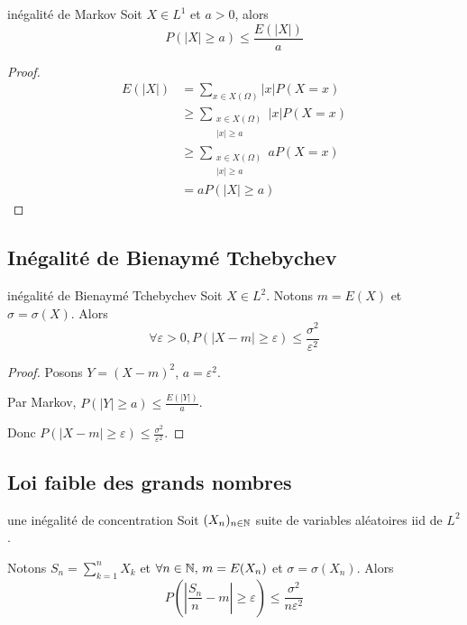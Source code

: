 \begin{proposition}{inégalité de Markov}{}
    Soit $X \in L^1$ et $a > 0$, alors 
    $$ P(|X| \geqslant a) \leqslant \frac{E(|X|)}{a} $$
\end{proposition}

\begin{proof}
    \begin{align}
        E(|X|) & = \sum_{x \in X(\Omega)} |x| P(X = x) \\
        & \geqslant \sum_{\substack{x \in X(\Omega) \\ |x| \geqslant a}} |x| P(X = x) \\
        & \geqslant \sum_{\substack{x \in X(\Omega) \\ |x| \geqslant a}} a P(X = x) \\
        & = a P(|X| \geqslant a)
    \end{align}
\end{proof}

\subsection{Inégalité de Bienaymé Tchebychev}

\begin{theoreme}{inégalité de Bienaymé Tchebychev}{}
    Soit $X \in L^2$. Notons $m = E(X)$ et $\sigma = \sigma(X)$.
    Alors $$\forall \varepsilon > 0, P(|X - m| \geqslant \varepsilon) \leqslant \frac{\sigma^2}{\varepsilon^2}$$
\end{theoreme}

\begin{proof}
    Posons $Y = (X - m)^2$, $a = \varepsilon^2$.

    Par Markov, $P(|Y| \geqslant a) \leqslant \frac{E(|Y|)}{a}$.

    Donc $P(|X - m| \geqslant \varepsilon) \leqslant \frac{\sigma^2}{\varepsilon^2}$.
\end{proof}

\subsection{Loi faible des grands nombres }

\begin{proposition}{une inégalité de concentration}{}
    Soit $(X_n)_{n \in \mathbb{N}}$ suite de variables aléatoires iid de $L^2$. 

    Notons $\displaystyle S_n = \sum_{k = 1 }^{n } X_k$ et $\forall n \in \mathbb{N}, \, m = E(X_n)$ et $\sigma = \sigma(X_n)$.
    Alors $$P\left( \left| \frac{S_n}{n} - m \right| \geqslant \varepsilon \right) \leqslant \frac{\sigma^2}{n \varepsilon^2}$$
\end{proposition}

